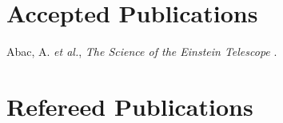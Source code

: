 \section{Accepted Publications}

\secstartswithlist{}%
\addtocounter{pubCounter}{-1}%
\begin{etaremune}[start=\value{pubCounter}]
    \item Abac, A. \textit{et al.},
    \textit{The Science of the Einstein Telescope}
    .
%
    \setcounter{pubCounter}{\value{enumi}}
\end{etaremune}


\section{Refereed Publications}

